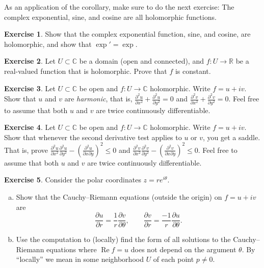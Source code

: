 \documentclass[12pt,openany]{book}
\renewcommand{\Re}{\operatorname{Re}}
\newcommand{\C}{{\mathbb{C}}}
\newcommand{\R}{{\mathbb{R}}}
\newcommand{\myindex}[1]{#1\index{#1}}
\newcommand{\myquote}[1]{``#1''}
\theoremstyle{plain}
\theoremstyle{remark}
\theoremstyle{definition}
\newenvironment{exbox}{%
    \def\FrameCommand{\vrule width 1pt \relax\hspace{10pt}}%
    \MakeFramed{\advance\hsize-\width\FrameRestore}%
}{%
    \endMakeFramed
}
\newenvironment{exparts}{%
    \leavevmode\begin{enumerate}[a),noitemsep,topsep=0pt,parsep=0pt,partopsep=0pt]
}{%
    \end{enumerate}
}
\theoremstyle{exercise}
\newtheorem{exercise}{Exercise}[section]
\theoremstyle{example}
\begin{document}
As an application of the corollary,
make sure to do the next exercise: The complex exponential,
sine, and cosine are all holomorphic functions.

\begin{exbox}
\begin{exercise} \label{exercise:exponentialholomorphic}
Show that the complex exponential function, sine, and cosine,
are holomorphic, and show that $\exp' = \exp$.
\end{exercise}

\begin{exercise}
Let $U \subset \C$ be a domain (open and connected),
and $f \colon U \to \R$ be a real-valued function that is holomorphic.
Prove that $f$ is constant.
\end{exercise}

\begin{exercise}
Let $U \subset \C$ be open and $f \colon U \to \C$ holomorphic.
Write $f = u+iv$.  Show that $u$ and $v$ are \emph{\myindex{harmonic}},
that is,
$\frac{\partial^2 u}{\partial x^2} +  \frac{\partial^2 u}{\partial y^2} = 0$
and
$\frac{\partial^2 v}{\partial x^2} +  \frac{\partial^2 v}{\partial y^2} = 0$.
Feel free to assume that both $u$ and $v$ are twice continuously
differentiable.
\end{exercise}

\begin{exercise}
Let $U \subset \C$ be open and $f \colon U \to \C$ holomorphic.
Write $f = u+iv$.  Show that whenever the second derivative test applies 
to $u$ or $v$, you get a saddle.  That is, prove
$\frac{\partial^2 u}{\partial x^2} \frac{\partial^2 u}{\partial y^2}
-{\left(\frac{\partial^2 u}{\partial x \partial y}\right)}^2 \leq 0$
and
$\frac{\partial^2 v}{\partial x^2} \frac{\partial^2 v}{\partial y^2}
-{\left(\frac{\partial^2 v}{\partial x \partial y}\right)}^2 \leq 0$.
Feel free to assume that both $u$ and $v$ are twice continuously
differentiable.
\end{exercise}

\begin{exercise}
Consider the polar coordinates $z = r e^{i\theta}$.
\begin{exparts}
\item
Show that 
the Cauchy--Riemann equations (outside the origin) on $f=u+iv$ are
\begin{equation*}
\frac{\partial u}{\partial r} = \frac{1}{r} \frac{\partial v}{\partial \theta},
\qquad
\frac{\partial v}{\partial r} = \frac{-1}{r} \frac{\partial u}{\partial \theta}.
\end{equation*}
\item
Use the computation to (locally) find the form of all solutions to 
the Cauchy--Riemann equations where $\Re f = u$ does not depend on the
argument $\theta$.  By \myquote{locally} we mean in some neighborhood $U$ of
each point $p \neq 0$.
\end{exparts}
\end{exercise}
\end{exbox}
\end{document}
